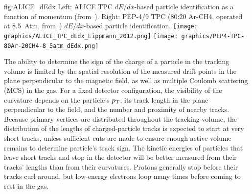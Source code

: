 \begin{dunefigure}{fig:ALICE_dEdx}
{Left: ALICE TPC $dE/dx$-based particle identification as a function of momentum (from~\cite{ALICE_Lippmann}). Right: PEP-4/9 TPC (80:20 Ar-CH4, operated at 8.5~Atm, from~\cite{Grupen:1999by}) $dE/dx$-based particle identification.}
\texttt{[image: graphics/ALICE\_TPC\_dEdx\_Lippmann\_2012.png]}
\texttt{[image: graphics/PEP4-TPC-80Ar-20CH4-8\_5atm\_dEdx.png]} 
\end{dunefigure}

%
The ability to determine the sign of the charge of a particle in the  tracking volume is limited by the spatial resolution of the measured drift points in the plane perpendicular to the magnetic field, as well as multiple Coulomb scattering (MCS) in the gas. For a fixed detector configuration, the visibility of the curvature depends on the particle's $p_{\rm{T}}$, its track length in the plane perpendicular to the field, and the number and proximity of nearby tracks.  Because primary vertices are distributed throughout the tracking volume, the distribution of the lengths of charged-particle tracks is expected to start at very short tracks, unless sufficient  cuts are made to ensure enough active volume remains to determine particle's track sign.  The kinetic energies of particles that leave short tracks and stop in the detector will be better measured from their tracks' lengths than from their curvatures.  Protons generally stop before their tracks curl around, but low-energy electrons loop many times before coming to rest in the gas.


